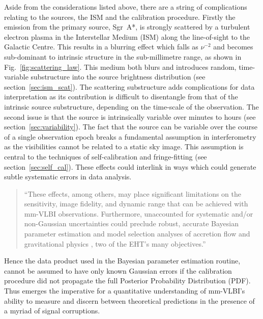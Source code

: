 Aside from the considerations listed above, there are a string of complications relating to the sources, the ISM and the calibration procedure. 
Firstly the emission from the primary source, Sgr~A*, is strongly scattered by a turbulent electron plasma in the Interstellar Medium (ISM) along the line-of-sight to the Galactic Centre. This results in a blurring effect \citep[e.g.][]{Fish_2014} which falls as $\nu^{-2}$ and becomes sub-dominant to intrinsic structure in the sub-millimetre range, as shown in Fig.~\ref{fig:scattering_law}. This medium both blurs and introduces random, time-variable substructure into the source brightness distribution (see section~\ref{sec:ism_scat}). The scattering substructure adds complications for data interpretation as its contribution is difficult to disentangle from that of the intrinsic source substructure, depending on the time-scale of the observation.
The second issue is that the source is intrinsically variable over minutes to hours (see section~\ref{sec:variability}). The fact that the source can be variable over the course of a single observation epoch breaks a fundamental assumption in interferometry as the visibilities cannot be related to a static sky image. This assumption is central to the techniques of self-calibration and fringe-fitting (see section~\ref{sec:self_cal}).
These effects could interlink in ways which could generate subtle systematic errors in data analysis. 


\begin{quotation}
``These effects, among others, may place significant limitations on the sensitivity, image fidelity, and dynamic range that can be achieved with mm-VLBI observations.  Furthermore, unaccounted for systematic and/or non-Gaussian uncertainties could preclude robust, accurate Bayesian parameter estimation and model selection analyses of accretion flow \citep[e.g.][]{Broderick_2016} and gravitational physics \citep[e.g.][]{Broderick_2014, Psaltis_2016}, two of the EHT's many objectives.''\\
\citep{Blecher_2016}
\end{quotation}


Hence the data product used in the Bayesian parameter estimation routine, cannot be assumed to have only known Gaussian errors if the calibration procedure did not propagate the full Posterior Probability Distribution (PDF). Thus emerges the imperative for a quantitative understanding of mm-VLBI's ability to measure and discern between theoretical predictions in the presence of a myriad of signal corruptions.


